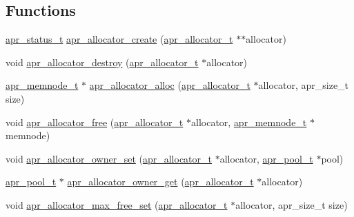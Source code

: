 \subsection*{Functions}
\begin{DoxyCompactItemize}
\item 
\hyperlink{group__apr__errno_gaf76ee4543247e9fb3f3546203e590a6c}{apr\+\_\+status\+\_\+t} \hyperlink{group__apr__allocator_gaf834f409a34b7f8656c045cff02fd953}{apr\+\_\+allocator\+\_\+create} (\hyperlink{group__apr__allocator_ga1ceabfd30fcfc455e47d052d2a24244b}{apr\+\_\+allocator\+\_\+t} $\ast$$\ast$allocator)
\item 
void \hyperlink{group__apr__allocator_ga704529f6b26279ad1c48d5e8372d859c}{apr\+\_\+allocator\+\_\+destroy} (\hyperlink{group__apr__allocator_ga1ceabfd30fcfc455e47d052d2a24244b}{apr\+\_\+allocator\+\_\+t} $\ast$allocator)
\item 
\hyperlink{structapr__memnode__t}{apr\+\_\+memnode\+\_\+t} $\ast$ \hyperlink{group__apr__allocator_ga7452b0837c2148bd63109f89bbc0c3db}{apr\+\_\+allocator\+\_\+alloc} (\hyperlink{group__apr__allocator_ga1ceabfd30fcfc455e47d052d2a24244b}{apr\+\_\+allocator\+\_\+t} $\ast$allocator, apr\+\_\+size\+\_\+t size)
\item 
void \hyperlink{group__apr__allocator_ga124e48339838213fd5e160a4125cb7e8}{apr\+\_\+allocator\+\_\+free} (\hyperlink{group__apr__allocator_ga1ceabfd30fcfc455e47d052d2a24244b}{apr\+\_\+allocator\+\_\+t} $\ast$allocator, \hyperlink{structapr__memnode__t}{apr\+\_\+memnode\+\_\+t} $\ast$memnode)
\item 
void \hyperlink{group__apr__allocator_gadf38bbec37c29c24388e95b1c9acad28}{apr\+\_\+allocator\+\_\+owner\+\_\+set} (\hyperlink{group__apr__allocator_ga1ceabfd30fcfc455e47d052d2a24244b}{apr\+\_\+allocator\+\_\+t} $\ast$allocator, \hyperlink{group__apr__pools_gaf137f28edcf9a086cd6bc36c20d7cdfb}{apr\+\_\+pool\+\_\+t} $\ast$pool)
\item 
\hyperlink{group__apr__pools_gaf137f28edcf9a086cd6bc36c20d7cdfb}{apr\+\_\+pool\+\_\+t} $\ast$ \hyperlink{group__apr__allocator_ga3cfe48c8717de6495480ce1479d262f1}{apr\+\_\+allocator\+\_\+owner\+\_\+get} (\hyperlink{group__apr__allocator_ga1ceabfd30fcfc455e47d052d2a24244b}{apr\+\_\+allocator\+\_\+t} $\ast$allocator)
\item 
void \hyperlink{group__apr__allocator_ga1d45cb6dbe69ba25dee0ec5f4e031d60}{apr\+\_\+allocator\+\_\+max\+\_\+free\+\_\+set} (\hyperlink{group__apr__allocator_ga1ceabfd30fcfc455e47d052d2a24244b}{apr\+\_\+allocator\+\_\+t} $\ast$allocator, apr\+\_\+size\+\_\+t size)
$$
\end{DoxyCompactItemize}
